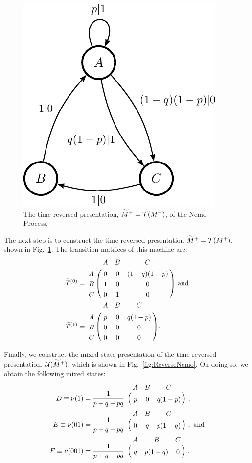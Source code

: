 \begin{figure}[th]
\begin{center}
\includegraphics{../chapter4/figures/nemo_TRfeM_gr}
\caption{The time-reversed presentation, $\widetilde{M}^+ = \mathcal{T}({M}^{+})$,
  of the Nemo Process.
  }
\label{fig:TRNemo}
\end{center}
\end{figure}

The next step is to construct the 
time-reversed presentation $\widetilde{M}^+ = \mathcal{T}({M}^{+})$, shown in 
Fig.~\ref{fig:TRNemo}.  The transition matrices of this machine are:
\begin{align*}
\widetilde{T}^{(0)} &=
    \bordermatrix{
    & A & B & C \cr
  A & 0 & 0 & (1-q)(1-p)\cr
  B & 1 & 0 & 0\cr
  C & 0 & 1 & 0\cr
} \textrm{ and} \\
\widetilde{T}^{(1)} &=
    \bordermatrix{
    & A & B & C \cr
  A & p & 0 & q(1-p)\cr
  B & 0 & 0 & 0\cr
  C & 0 & 0 & 0\cr
}.
\end{align*}

Finally, we construct the mixed-state presentation of the time-reversed
presentation, $\mathcal{U}(\widetilde{M}^+)$, which is shown in 
Fig.~\ref{fig:ReverseNemo}. On doing so, we obtain the following
mixed states:
\begin{align*}
D \equiv \nu(1) &= \frac{1}{p + q - pq} 
\bordermatrix{
 & A & B & C \cr
 & p & 0 & q(1-p)
} ~,\\
E \equiv \nu(01) &= \frac{1}{p + q - pq} 
\bordermatrix{
 & A & B & C \cr
 & 0 & q & p(1-q)
} ~, ~\mathrm{and}\\
F \equiv \nu(001) &= \frac{1}{p + q - pq} 
\bordermatrix{
 & A & B & C \cr
 & q & p(1-q) & 0 
} ~.
\end{align*}

